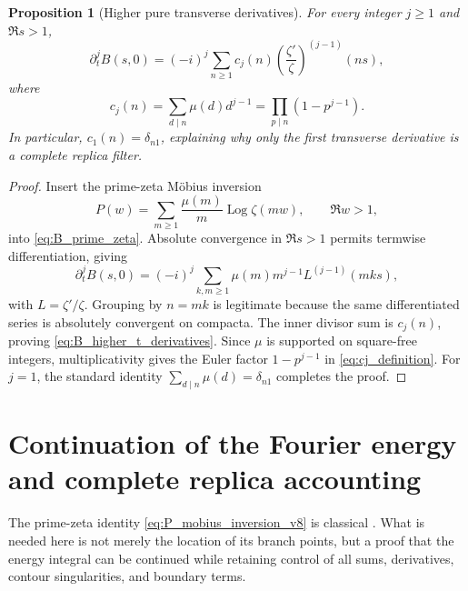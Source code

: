 \documentclass[11pt]{amsart}
\numberwithin{equation}{section}
\theoremstyle{plain}
\newtheorem{proposition}[theorem]{Proposition}
\theoremstyle{definition}
\theoremstyle{remark}
\newcommand{\Log}{\operatorname{Log}}
\begin{document}
\begin{proposition}[Higher pure transverse derivatives]
\label{prop:B_higher_transverse}
For every integer \(j\ge1\) and \(\Re s>1\),
\begin{equation}
\partial_t^jB(s,0)
=(-i)^j\sum_{n\ge1}c_j(n)
\left(\frac{\zeta'}{\zeta}\right)^{(j-1)}(ns),
\label{eq:B_higher_t_derivatives}
\end{equation}
where
\begin{equation}
c_j(n)=\sum_{d\mid n}\mu(d)d^{j-1}
=\prod_{p\mid n}(1-p^{j-1}).
\label{eq:cj_definition}
\end{equation}
In particular, \(c_1(n)=\delta_{n1}\), explaining why only the first
transverse derivative is a complete replica filter.
\end{proposition}

\begin{proof}
Insert the prime-zeta M\"obius inversion
\begin{equation}
P(w)=\sum_{m\ge1}\frac{\mu(m)}m\Log\zeta(mw),
\qquad \Re w>1,
\label{eq:P_mobius_inversion_v8}
\end{equation}
into \eqref{eq:B_prime_zeta}.  Absolute convergence in \(\Re s>1\) permits
termwise differentiation, giving
\begin{equation}
\partial_t^jB(s,0)
=(-i)^j\sum_{k,m\ge1}\mu(m)m^{j-1}
L^{(j-1)}(mks),
\label{eq:B_higher_double}
\end{equation}
with \(L=\zeta'/\zeta\).  Grouping by \(n=mk\) is legitimate because the
same differentiated series is absolutely convergent on compacta.  The inner
divisor sum is \(c_j(n)\), proving \eqref{eq:B_higher_t_derivatives}.  Since
\(\mu\) is supported on square-free integers, multiplicativity gives the
Euler factor \(1-p^{j-1}\) in \eqref{eq:cj_definition}.  For \(j=1\), the
standard identity \(\sum_{d\mid n}\mu(d)=\delta_{n1}\) completes the proof.
\end{proof}

\section{Continuation of the Fourier energy and complete replica accounting}
\label{sec:mobius_replica_filter}

The prime-zeta identity \eqref{eq:P_mobius_inversion_v8} is classical
\cite{Froberg1968}.  What is needed here is not merely the location of its
branch points, but a proof that the energy integral can be continued while
retaining control of all sums, derivatives, contour singularities, and
boundary terms.
\end{document}
